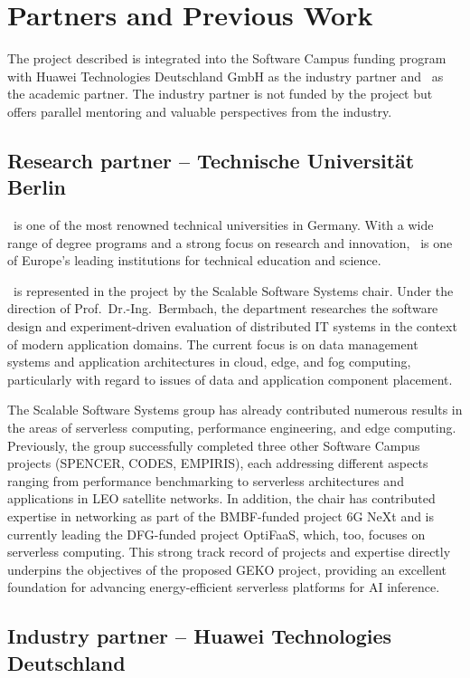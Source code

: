 \clearpage
\section{Partners and Previous Work}
\label{sec:partner}

The project described is integrated into the Software Campus funding program with Huawei Technologies Deutschland GmbH as the industry partner and \TU\ as the academic partner.
The industry partner is not funded by the project but offers parallel mentoring and valuable perspectives from the industry.

\subsection{Research partner -- Technische Universität Berlin}
\label{sec:partner:tub}

\TU\ is one of the most renowned technical universities in Germany.
With a wide range of degree programs and a strong focus on research and innovation, \TU\ is one of Europe's leading institutions for technical education and science.

\TU\ is represented in the project by the Scalable Software Systems chair.
Under the direction of Prof.~Dr.-Ing.~Bermbach, the department researches the software design and experiment-driven evaluation of distributed IT systems in the context of modern application domains.
The current focus is on data management systems and application architectures in cloud, edge, and fog computing, particularly with regard to issues of data and application component placement.

The Scalable Software Systems group has already contributed numerous results in the areas of serverless computing, performance engineering, and edge computing.
Previously, the group successfully completed three other Software Campus projects (SPENCER, CODES, EMPIRIS), each addressing different aspects ranging from performance benchmarking to serverless architectures and applications in LEO satellite networks.
In addition, the chair has contributed expertise in networking as part of the BMBF-funded project 6G NeXt and is currently leading the DFG-funded project OptiFaaS, which, too, focuses on serverless computing.
This strong track record of projects and expertise directly underpins the objectives of the proposed GEKO project, providing an excellent foundation for advancing energy-efficient serverless platforms for AI inference.

\subsection{Industry partner -- Huawei Technologies Deutschland}
\label{sec:partner:industrie}

